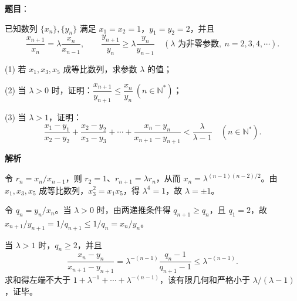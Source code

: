 \begin{answer}

\textbf{题目}：

已知数列 \(\{x_n\},\{y_n\}\) 满足 \(x_1=x_2=1\)，\(y_1=y_2=2\)，并且
\nopagebreak[4]
\[
\frac{x_{n+1}}{x_n}=\lambda\frac{x_n}{x_{n-1}},\qquad
\frac{y_{n+1}}{y_n}\geq\lambda\frac{y_n}{y_{n-1}}
\quad(\lambda\text{ 为非零参数},\ n=2,3,4,\cdots).
\]

(1) 若 \(x_1,x_3,x_5\) 成等比数列，求参数 \(\lambda\) 的值；

(2) 当 \(\lambda>0\) 时，证明：\(\dfrac{x_{n+1}}{y_{n+1}}\leq\dfrac{x_n}{y_n}\ (n\in\mathbb N^*)\)；

(3) 当 \(\lambda>1\)，证明：
\nopagebreak[4]
\[
\frac{x_1-y_1}{x_2-y_2}+\frac{x_2-y_2}{x_3-y_3}+\cdots+\frac{x_n-y_n}{x_{n+1}-y_{n+1}}<\frac{\lambda}{\lambda-1}\quad(n\in\mathbb N^*).
\]

\textbf{解析}


令 \(r_n=x_n/x_{n-1}\)，则 \(r_2=1\)、\(r_{n+1}=\lambda r_n\)，从而 \(x_n=\lambda^{(n-1)(n-2)/2}\)。由 \(x_1,x_3,x_5\) 成等比数列，\(x_3^2=x_1x_5\)，得 \(\lambda^4=1\)，故 \(\lambda=\pm1\)。


令 \(q_n=y_n/x_n\)。当 \(\lambda>0\) 时，由两递推条件得 \(q_{n+1}\ge q_n\)，且 \(q_1=2\)，故 \(x_{n+1}/y_{n+1}=1/q_{n+1}\le1/q_n=x_n/y_n\)。


当 \(\lambda>1\) 时，\(q_n\ge2\)，并且
\nopagebreak[4]
\[
\frac{x_n-y_n}{x_{n+1}-y_{n+1}}=\lambda^{-(n-1)}\frac{q_n-1}{q_{n+1}-1}\le\lambda^{-(n-1)}.
\]
求和得左端不大于 \(1+\lambda^{-1}+\cdots+\lambda^{-(n-1)}\)，该有限几何和严格小于 \(\lambda/(\lambda-1)\)，证毕。




\end{answer}
